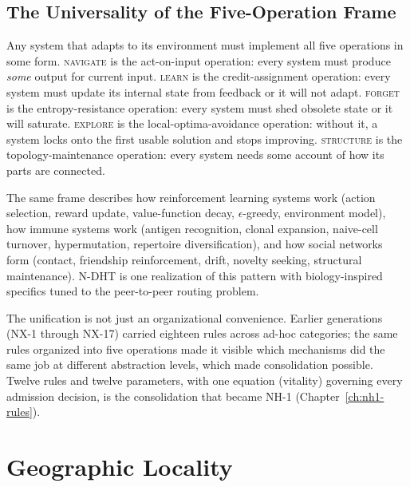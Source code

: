 \documentclass[twoside,nobib]{tufte-book}
\newcommand{\NDHT}{N-DHT\xspace}
\begin{document}
\section{The Universality of the Five-Operation Frame}

 Any system that adapts to
its environment must implement all five operations in some form.
\textsc{navigate} is the act-on-input operation: every system
must produce \emph{some} output for current input. \textsc{learn}
is the credit-assignment operation: every system must update its
internal state from feedback or it will not adapt.
\textsc{forget} is the entropy-resistance operation: every
system must shed obsolete state or it will saturate.
\textsc{explore} is the local-optima-avoidance operation:
without it, a system locks onto the first usable solution and
stops improving. \textsc{structure} is the topology-maintenance
operation: every system needs some account of how its parts are
connected.

The same frame describes how reinforcement learning systems work
(action selection, reward update, value-function decay,
$\epsilon$-greedy, environment model), how immune systems work
(antigen recognition, clonal expansion, naive-cell turnover,
hypermutation, repertoire diversification), and how social
networks form (contact, friendship reinforcement, drift, novelty
seeking, structural maintenance). \NDHT is one realization of
this pattern with biology-inspired specifics tuned to the
peer-to-peer routing problem.

The unification is not just an organizational convenience.
Earlier generations (NX-1 through NX-17) carried eighteen rules
across ad-hoc categories; the same rules organized into five
operations made it visible which mechanisms did the same job at
different abstraction levels, which made consolidation possible.
Twelve rules and twelve parameters, with one equation (vitality)
governing every admission decision, is the consolidation that
became NH-1 (Chapter~\ref{ch:nh1-rules}).


\chapter{Geographic Locality}
\label{ch:locality}
\end{document}
